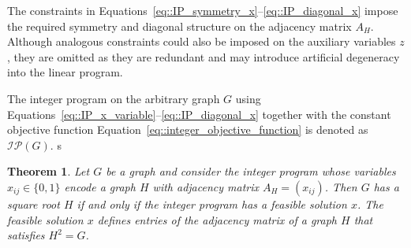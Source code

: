 \documentclass[11pt]{article}
\newtheorem{theorem}{Theorem}
\begin{document}
The constraints in Equations~\eqref{eq::IP_symmetry_x}--\eqref{eq::IP_diagonal_x} impose the required symmetry and diagonal structure on the adjacency matrix $A_H$. Although analogous constraints could also be imposed on the auxiliary variables $z$, they are omitted as they are redundant and may introduce artificial degeneracy into the linear program.

The integer program on the arbitrary graph $G$ using Equations~\eqref{eq::IP_x_variable}--\eqref{eq::IP_diagonal_x} together with the constant objective function Equation~\eqref{eq::integer_objective_function} is denoted as $\mathcal{IP}(G)$. s

\begin{theorem} \label{theorem::IP_gives_root}
  Let $G$ be a graph and consider the integer program whose variables $x_{ij} \in \{0,1\}$ encode a graph $H$ with adjacency matrix $A_H = (x_{ij})$. Then $G$ has a square root $H$ if and only if the integer  program has a feasible solution $x$. The feasible solution $x$ defines entries of the adjacency matrix of a graph $H$ that satisfies $H^2 = G$.
\end{theorem}
\end{document}
